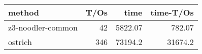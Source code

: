 \begin{tabular}{lrrr}
\hline
 method            &   T/Os &     time &   time-T/Os \\
\hline
 z3-noodler-common &     42 &  5822.07 &      782.07 \\
 ostrich           &    346 & 73194.2  &    31674.2  \\
\hline
\end{tabular}
